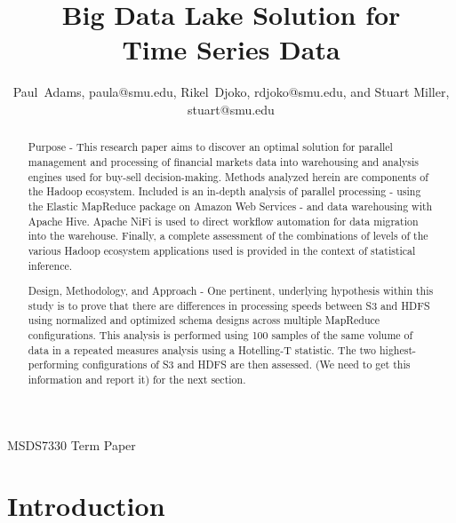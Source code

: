 \documentclass[journal]{IEEEtran}
\begin{document}
\title{Big Data Lake Solution for\\ 
    Time Series Data}

\author{Paul~Adams, paula@smu.edu,
        Rikel~Djoko, rdjoko@smu.edu,
        and Stuart Miller, stuart@smu.edu}%

{MSDS7330 Term Paper}

\maketitle

\begin{abstract}

Purpose - This research paper aims to discover an optimal solution for parallel management and processing of financial markets data into  warehousing and analysis engines used for buy-sell decision-making. Methods analyzed herein are components of the Hadoop ecosystem. Included is an in-depth analysis of parallel processing - using the Elastic MapReduce package on Amazon Web Services - and data warehousing with Apache Hive. Apache NiFi is used to direct workflow automation for data migration into the warehouse. Finally, a complete assessment of the combinations of levels of the various Hadoop ecosystem applications used is provided in the context of statistical inference.

Design, Methodology, and Approach - One pertinent, underlying hypothesis within this study is to prove that there are differences in processing speeds between S3 and HDFS using normalized and optimized schema designs across multiple MapReduce configurations. This analysis is performed using 100 samples of the same volume of data in a repeated measures analysis using a Hotelling-T statistic. The two highest-performing configurations of S3 and HDFS are then assessed. (We need to get this information and report it) for the next section.

\end{abstract}

\section{Introduction}
\end{document}
